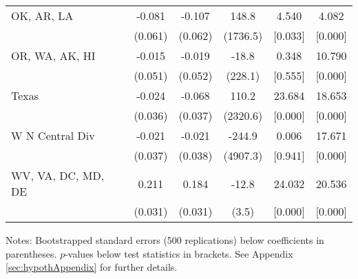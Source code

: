 \begin{landscape}
\begin{table}[ht]
{\begin{threeparttable}
\begin{tabular}{lccccc}
OK, AR, LA & -0.081 & -0.107 & 148.8 & 4.540 & 4.082 \\ 
 & (0.061) & (0.062) & (1736.5) & [0.033] & [0.000] \\ 
OR, WA, AK, HI & -0.015 & -0.019 & -18.8 & 0.348 & 10.790 \\ 
 & (0.051) & (0.052) & (228.1) & [0.555] & [0.000] \\ 
Texas & -0.024 & -0.068 & 110.2 & 23.684 & 18.653 \\ 
 & (0.036) & (0.037) & (2320.6) & [0.000] & [0.000] \\ 
W N Central Div & -0.021 & -0.021 & -244.9 & 0.006 & 17.671 \\ 
 & (0.037) & (0.038) & (4907.3) & [0.941] & [0.000] \\ 
WV, VA, DC, MD, DE & 0.211 & 0.184 & -12.8 & 24.032 & 20.536 \\ 
 & (0.031) & (0.031) & (3.5) & [0.000] & [0.000] \\ 
\bottomrule
\end{tabular}
{\footnotesize {\raggedright Notes: Bootstrapped standard errors (500 replications) below coefficients in parentheses. $p$-values below test statistics in brackets. See Appendix \ref{sec:hypothAppendix} for further details.}}
\end{threeparttable}
}
\end{table}
\end{landscape}
